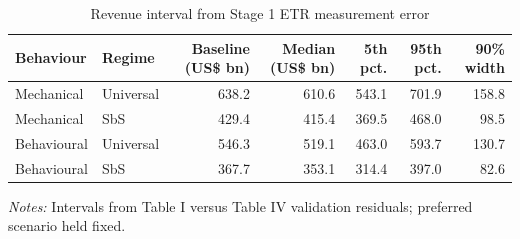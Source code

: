 \begin{table}[H]
\centering
\small
\setlength{\tabcolsep}{4pt}
\caption[Stage 1 ETR measurement-error interval]{Revenue interval from Stage 1 ETR measurement error}
\label{tab:stage1_measurement_error_interval}
\begin{tabular}{@{}llrrrrr@{}}
\toprule
Behaviour & Regime & Baseline (US\$ bn) & Median (US\$ bn) & 5th pct. & 95th pct. & 90\% width \\
\midrule
Mechanical & Universal & 638.2 & 610.6 & 543.1 & 701.9 & 158.8 \\
Mechanical & SbS & 429.4 & 415.4 & 369.5 & 468.0 &  98.5 \\
Behavioural & Universal & 546.3 & 519.1 & 463.0 & 593.7 & 130.7 \\
Behavioural & SbS & 367.7 & 353.1 & 314.4 & 397.0 &  82.6 \\
\bottomrule
\end{tabular}

\vspace{0.35em}
\noindent\begin{minipage}{\textwidth}
\footnotesize\raggedright\textit{Notes:} Intervals from Table I versus Table IV validation residuals; preferred scenario held fixed.
\end{minipage}
\end{table}

